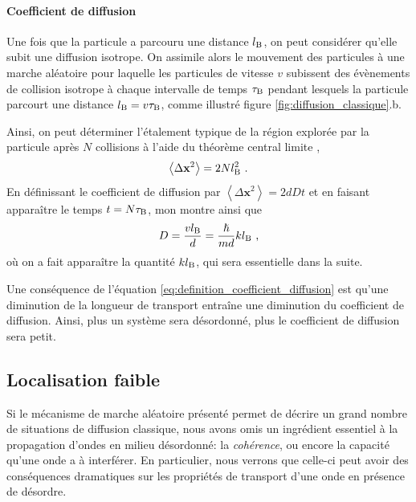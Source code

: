 \paragraph*{Coefficient de diffusion}
Une fois que la particule a parcouru une distance $l_{\mathrm{B}}$, on peut considérer qu'elle subit une diffusion isotrope. On assimile alors le mouvement des particules à une marche aléatoire pour laquelle les particules de vitesse $v$ subissent des évènements de collision isotrope à chaque intervalle de temps $\tau_{\mathrm{B}}$ pendant lesquels la particule parcourt une distance $l_{\mathrm{B}}=v \tau_{\mathrm{B}}$, comme illustré figure \ref{fig:diffusion_classique}.b.

Ainsi, on peut déterminer l'étalement typique de la région explorée par la particule après $N$ collisions à l'aide du théorème central limite \citep{diu1989elements},
\begin{equation}
\left\langle \Delta \mathbf{x}^2 \right\rangle=2 N l_{\mathrm{B}}^2 \text{ .}
\end{equation}
En définissant le coefficient de diffusion par $ \left\langle \Delta \mathbf{x}^2 \right\rangle = 2 d D t$ et en faisant apparaître le temps $t=N \tau_{\mathrm{B}}$, mon montre ainsi que 
\begin{equation}
D=\frac{v l_{\mathrm{B}}}{d}=\frac{\hslash}{m d} k l_{\mathrm{B}} \text{ ,}
\label{eq:definition_coefficient_diffusion}
\end{equation}
où on a fait apparaître la quantité $k l_{\mathrm{B}}$, qui sera essentielle dans la suite.

Une conséquence de l'équation \ref{eq:definition_coefficient_diffusion} est qu'une diminution de la longueur de transport entraîne une diminution du coefficient de diffusion. Ainsi, plus un système sera désordonné, plus le coefficient de diffusion sera petit.














\subsection{Localisation faible}
\label{sc:weak_localisation}
Si le mécanisme de marche aléatoire présenté permet de décrire un grand nombre de situations de diffusion classique, nous avons omis un ingrédient essentiel à la propagation d'ondes en milieu désordonné: la \emph{cohérence}, ou encore la capacité qu'une onde a à interférer. En particulier, nous verrons que celle-ci peut avoir des conséquences dramatiques sur les propriétés de transport d'une onde en présence de désordre.

